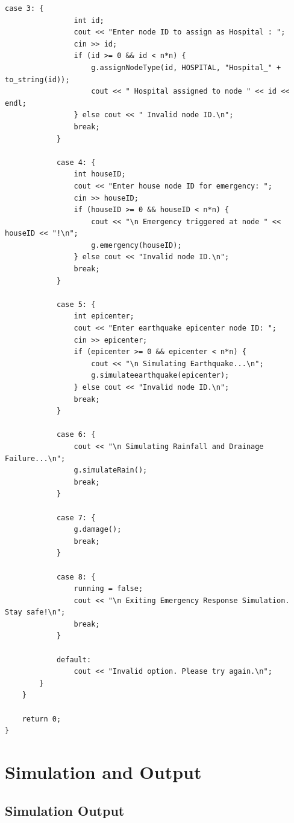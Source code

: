 \documentclass[12pt,a4paper]{report}
\begin{document}
\begin{lstlisting}[style=cpp, caption={main.cpp – Disaster Management System Simulation}]
            case 3: {
                int id;
                cout << "Enter node ID to assign as Hospital : ";
                cin >> id;
                if (id >= 0 && id < n*n) {
                    g.assignNodeType(id, HOSPITAL, "Hospital_" + to_string(id));
                    cout << " Hospital assigned to node " << id << endl;
                } else cout << " Invalid node ID.\n";
                break;
            }

            case 4: {
                int houseID;
                cout << "Enter house node ID for emergency: ";
                cin >> houseID;
                if (houseID >= 0 && houseID < n*n) {
                    cout << "\n Emergency triggered at node " << houseID << "!\n";
                    g.emergency(houseID);
                } else cout << "Invalid node ID.\n";
                break;
            }

            case 5: {
                int epicenter;
                cout << "Enter earthquake epicenter node ID: ";
                cin >> epicenter;
                if (epicenter >= 0 && epicenter < n*n) {
                    cout << "\n Simulating Earthquake...\n";
                    g.simulateearthquake(epicenter);
                } else cout << "Invalid node ID.\n";
                break;
            }

            case 6: {
                cout << "\n Simulating Rainfall and Drainage Failure...\n";
                g.simulateRain();
                break;
            }

            case 7: {
                g.damage();
                break;
            }

            case 8: {
                running = false;
                cout << "\n Exiting Emergency Response Simulation. Stay safe!\n";
                break;
            }

            default:
                cout << "Invalid option. Please try again.\n";
        }
    }

    return 0;
}
\end{lstlisting}

\chapter{Simulation and Output}

\section*{Simulation Output}
\end{document}
